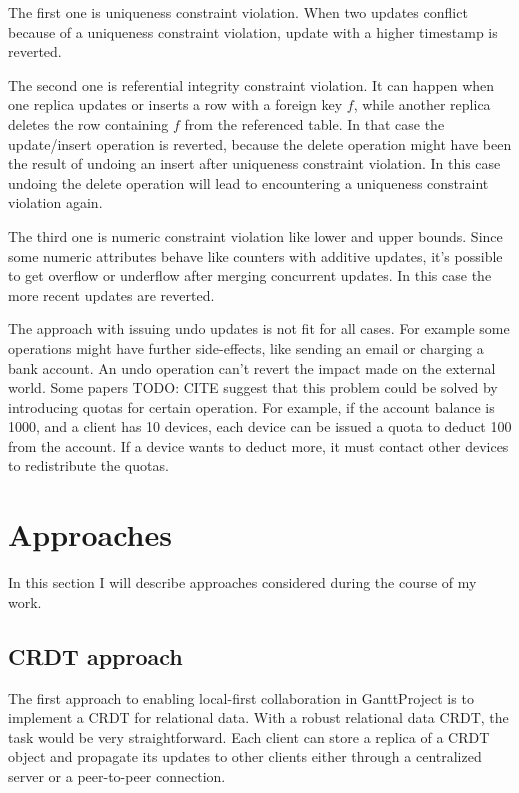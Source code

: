 \documentclass[a4paper, 11pt, oneside]{article}
\theoremstyle{definition}
\begin{document}
The first one is uniqueness constraint violation. When two updates conflict because of a uniqueness constraint violation, update with a higher timestamp is reverted. 

The second one is referential integrity constraint violation. It can happen when one replica updates or inserts a row with a foreign key $f$, while another replica deletes the row containing $f$ from the referenced table. In that case the update/insert operation is reverted, because the delete operation might have been the result of undoing an insert after uniqueness constraint violation. In this case undoing the delete operation will lead to encountering a uniqueness constraint violation again.

The third one is numeric constraint violation like lower and upper bounds. Since some numeric attributes behave like counters with additive updates, it's possible to get overflow or underflow after merging concurrent updates. In this case the more recent updates are reverted.

The approach with issuing undo updates is not fit for all cases. For example some operations might have further side-effects, like sending an email or charging a bank account.  An undo operation can't revert the impact made on the external world. Some papers TODO: CITE suggest that this problem could be solved by introducing quotas for certain operation. For example, if the account balance is 1000, and a client has 10 devices, each device can be issued a quota to deduct 100 from the account. If a device wants to deduct more, it must contact other devices to redistribute the quotas. 


\section{Approaches}
In this section I will describe approaches considered during the course of my work.

\subsection{CRDT approach}
The first approach to enabling local-first collaboration in GanttProject is to implement a CRDT for relational data. With a robust relational data CRDT, the task would be very straightforward. Each client can store a replica of a CRDT object and propagate its updates to other clients either through a centralized server or a peer-to-peer connection.
\end{document}
